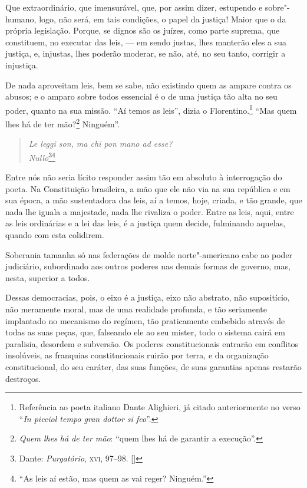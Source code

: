 Que extraordinário, que imensurável, que, por assim dizer,
estupendo e sobre"-humano, logo, não será, em tais condições, o papel da
justiça! Maior que o da própria legislação. Porque, se dignos são os
juízes, como parte suprema, que constituem, no executar das leis, --- em
sendo justas, lhes manterão eles a sua justiça, e, injustas, lhes
poderão moderar, se não, até, no seu tanto, corrigir a injustiça.

De nada aproveitam leis, bem se sabe, não existindo quem as ampare
contra os abusos; e o amparo sobre todos essencial é o de uma justiça
tão alta no seu poder, quanto na sua missão. ``Aí temos as
leis'', dizia o Florentino.\footnote{Referência ao poeta italiano Dante
Alighieri, já citado anteriormente no verso ``\textit{In picciol tempo gran dottor si feo}''.} ``Mas quem lhes há de
ter mão?\footnote{ \textit{Quem lhes há de ter mão}: ``quem lhes há de garantir a execução''.} Ninguém''.


\begin{verse}
\textit{Le leggi son, ma chi pon mano ad esse?}\\
\textit{Nullo}\footnote[*]{Dante: \emph{Purgatório}, \textsc{xvi}, 97--98. []}\footnote{``As leis aí estão, mas quem as vai reger?
Ninguém.''}
\end{verse}

Entre nós não seria lícito responder assim tão em absoluto à
interrogação do poeta. Na Constituição brasileira, a mão que ele não
via na sua república e em sua época, a mão sustentadora das leis, aí a
temos, hoje, criada, e tão grande, que nada lhe iguala a majestade,
nada lhe rivaliza o poder. Entre as leis, aqui, entre as leis
ordinárias e a lei das leis, é a justiça quem decide, fulminando
aquelas, quando com esta colidirem.

Soberania tamanha só nas federações de molde norte"-americano cabe
ao poder judiciário, subordinado aos outros poderes nas demais formas
de governo, mas, nesta, superior a todos.

Dessas democracias, pois, o eixo é a justiça, eixo não abstrato,
não supositício, não meramente moral, mas de uma realidade profunda, e
tão seriamente implantado no mecanismo do regímen, tão praticamente
embebido através de todas as suas peças, que, falseando ele ao seu
mister, todo o sistema cairá em paralisia, desordem e subversão. Os
poderes constitucionais entrarão em conflitos insolúveis, as franquias
constitucionais ruirão por terra, e da organização constitucional, do
seu caráter, das suas funções, de suas garantias apenas restarão destroços.

